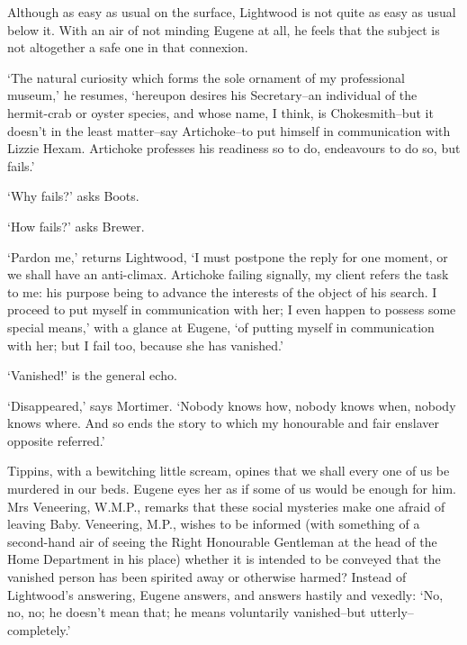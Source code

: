 Although as easy as usual on the surface, Lightwood is not quite as easy
as usual below it. With an air of not minding Eugene at all, he feels
that the subject is not altogether a safe one in that connexion.

‘The natural curiosity which forms the sole ornament of my professional
museum,’ he resumes, ‘hereupon desires his Secretary--an individual
of the hermit-crab or oyster species, and whose name, I think, is
Chokesmith--but it doesn’t in the least matter--say Artichoke--to put
himself in communication with Lizzie Hexam. Artichoke professes his
readiness so to do, endeavours to do so, but fails.’

‘Why fails?’ asks Boots.

‘How fails?’ asks Brewer.

‘Pardon me,’ returns Lightwood, ‘I must postpone the reply for one
moment, or we shall have an anti-climax. Artichoke failing signally, my
client refers the task to me: his purpose being to advance the interests
of the object of his search. I proceed to put myself in communication
with her; I even happen to possess some special means,’ with a glance
at Eugene, ‘of putting myself in communication with her; but I fail too,
because she has vanished.’

‘Vanished!’ is the general echo.

‘Disappeared,’ says Mortimer. ‘Nobody knows how, nobody knows when,
nobody knows where. And so ends the story to which my honourable and
fair enslaver opposite referred.’

Tippins, with a bewitching little scream, opines that we shall every one
of us be murdered in our beds. Eugene eyes her as if some of us would
be enough for him. Mrs Veneering, W.M.P., remarks that these social
mysteries make one afraid of leaving Baby. Veneering, M.P., wishes to
be informed (with something of a second-hand air of seeing the Right
Honourable Gentleman at the head of the Home Department in his place)
whether it is intended to be conveyed that the vanished person has been
spirited away or otherwise harmed? Instead of Lightwood’s answering,
Eugene answers, and answers hastily and vexedly: ‘No, no, no; he doesn’t
mean that; he means voluntarily vanished--but utterly--completely.’

